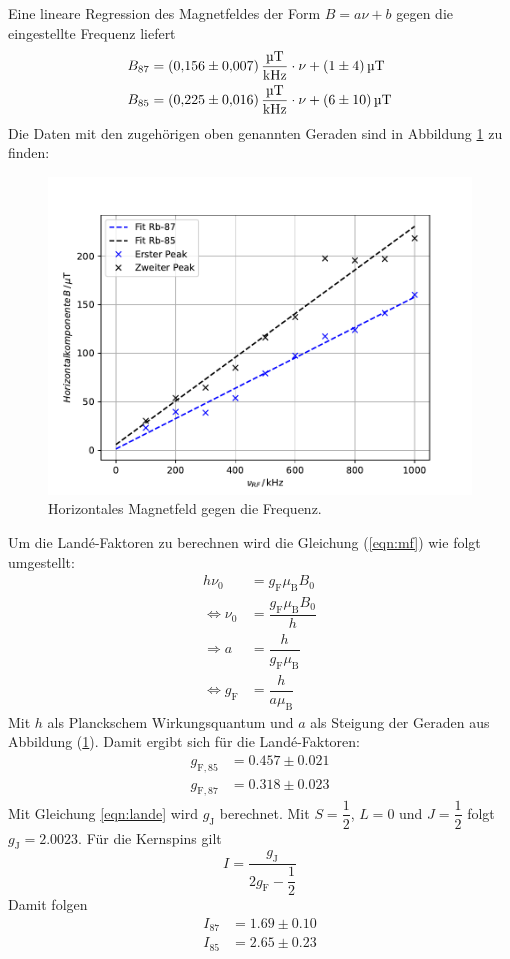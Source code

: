 Eine lineare Regression des Magnetfeldes der Form $B=a\nu+b$ gegen die eingestellte Frequenz liefert
\begin{align*}
  B_{87} &= \SI{0.156\pm0.007}{\micro\tesla\per\kilo\hertz}\cdot\nu + \SI{1\pm4}{\micro\tesla} \\
  B_{85} &= \SI{0.225\pm0.016}{\micro\tesla\per\kilo\hertz}\cdot\nu + \SI{6\pm10}{\micro\tesla} \\
\end{align*}
Die Daten mit den zugehörigen oben genannten Geraden sind in Abbildung \ref{fig:rf} zu finden:
\begin{figure}[h!]
  \centering
  \includegraphics[scale=0.7]{fig/plot1.pdf}
  \caption{Horizontales Magnetfeld gegen die Frequenz.}
  \label{fig:rf}
\end{figure}
\FloatBarrier
Um die Landé-Faktoren zu berechnen wird die Gleichung (\ref{eqn:mf}) wie folgt umgestellt:
\begin{align*}
  h\nu_\mathrm{0}&=g_\mathrm{F}\mu_\mathrm{B}B_\mathrm{0} \\
  \Leftrightarrow \nu_\mathrm{0} &=\dfrac{g_\mathrm{F}\mu_\mathrm{B}B_\mathrm{0}}{h} \\
  \Rightarrow a&=\dfrac{h}{g_\mathrm{F}\mu_\mathrm{B}} \\
  \Leftrightarrow g_\mathrm{F}&=\dfrac{h}{a\mu_\mathrm{B}}
\end{align*}
Mit $h$ als Planckschem Wirkungsquantum und $a$ als Steigung der Geraden aus Abbildung (\ref{fig:rf}).
Damit ergibt sich für die Landé-Faktoren:
\begin{align*}
  g_{\mathrm{F,85}} &= 0.457\pm0.021\\
  g_{\mathrm{F,87}} &= 0.318\pm0.023
\end{align*}
Mit Gleichung \ref{eqn:lande} wird $g_\mathrm{J}$ berechnet.
Mit $S=\dfrac{1}{2}$, $L=0$ und $J=\dfrac{1}{2}$ folgt $g_\mathrm{J} = 2.0023$.
Für die Kernspins gilt
\begin{equation}
  I = \dfrac{g_\mathrm{J}}{2g_\mathrm{F}-\dfrac{1}{2}}
\end{equation}
Damit folgen
\begin{align*}
  I_\mathrm{87} &= 1.69\pm0.10 \\
  I_\mathrm{85} &= 2.65\pm0.23
\end{align*}

